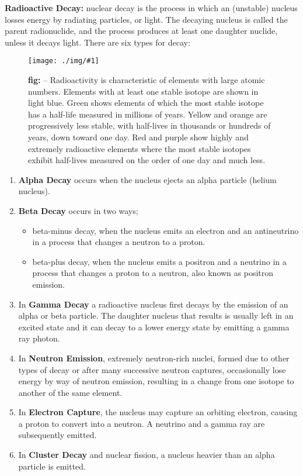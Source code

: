 \documentclass[10pt,a4paper]{article}
\newcounter{figurecounter}
\newcommand{\img}[3]{
    \begin{figure}[h!]
        \centering
        \captionsetup{justification=centering,margin=0cm,labelformat=empty}
        \texttt{[image: ./img/\#1]}
        \label{figure}
        \caption{\small\textbf{fig: \thefigurecounter} -- \textcolor{darkliver}{#3}}
    \end{figure}
    \addtocounter{figurecounter}{1}}
\begin{document}
\textbf{Radioactive Decay:} nuclear decay is the process in which an (unstable) nucleus losses energy by radiating particles, or light. The decaying nucleus is called the parent radionuclide, and the process produces at least one daughter nuclide, unless it decays light. There are six types for decay:
\img{ptableradioactive}{1}{Radioactivity is characteristic of elements with large atomic numbers. Elements with at least one stable isotope are shown in light blue. Green shows elements of which the most stable isotope has a half-life measured in millions of years. Yellow and orange are progressively less stable, with half-lives in thousands or hundreds of years, down toward one day. Red and purple show highly and extremely radioactive elements where the most stable isotopes exhibit half-lives measured on the order of one day and much less.}
\begin{enumerate}
    \item \textbf{Alpha Decay} occurs when the nucleus ejects an alpha particle (helium nucleus).

    \item \textbf{Beta Decay} occurs in two ways;
    \begin{itemize}
        \item beta-minus decay, when the nucleus emits an electron and an antineutrino in a process that changes a neutron to a proton.
        \item  beta-plus decay, when the nucleus emits a positron and a neutrino in a process that changes a proton to a neutron, also known as positron emission.
    \end{itemize}

    \item In \textbf{Gamma Decay} a radioactive nucleus first decays by the emission of an alpha or beta particle. The daughter nucleus that results is usually left in an excited state and it can decay to a lower energy state by emitting a gamma ray photon.

    \item In \textbf{Neutron Emission}, extremely neutron-rich nuclei, formed due to other types of decay or after many successive neutron captures, occasionally lose energy by way of neutron emission, resulting in a change from one isotope to another of the same element.
    
    \item In \textbf{Electron Capture}, the nucleus may capture an orbiting electron, causing a proton to convert into a neutron. A neutrino and a gamma ray are subsequently emitted.
    
    \item In \textbf{Cluster Decay} and nuclear fission, a nucleus heavier than an alpha particle is emitted.
\end{enumerate}
\end{document}
